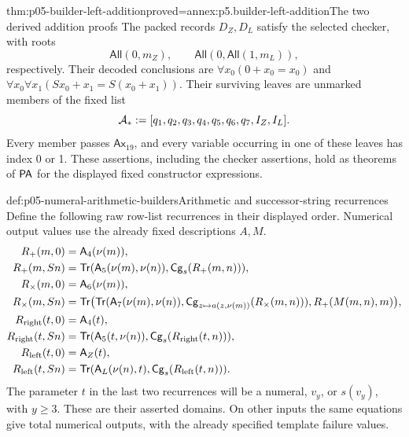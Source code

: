 \begin{hblemma}{thm:p05-builder-left-addition}{proved=annex:p5.builder-left-addition}{The two derived addition proofs}
The packed records \(D_Z,D_L\) satisfy the selected checker, with roots
\[
 \mathsf{All}(0,m_Z),\qquad
 \mathsf{All}(0,\mathsf{All}(1,m_L)),
\]
respectively. Their decoded conclusions are
\(\forall x_0(0+x_0=x_0)\) and
\(\forall x_0\forall x_1(Sx_0+x_1=S(x_0+x_1))\).
Their surviving leaves are unmarked members of the fixed list
\[
 \mathcal A_*\mathrel{:=}[q_1,q_2,q_3,q_4,q_5,q_6,q_7,I_Z,I_L].
\]
Every member passes \(\mathsf{Ax}_{19}\), and every variable occurring in
one of these leaves has index 0 or 1. These assertions, including the
checker assertions, hold as theorems of \(\mathsf{PA}\) for the displayed fixed
constructor expressions.
\end{hblemma}

\begin{hbdefinition}{def:p05-numeral-arithmetic-builders}{Arithmetic and successor-string recurrences}
Define the following raw row-list recurrences in their displayed order.
Numerical output values use the already fixed descriptions \(A,M\).
\[
\begin{aligned}
 R_+(m,0)&=\mathsf A_4(\nu(m)),\\
 R_+(m,Sn)&=\mathsf{Tr}(\mathsf A_5(\nu(m),\nu(n)),
                                      \mathsf{Cg}_s(R_+(m,n))),\\
 R_\times(m,0)&=\mathsf A_6(\nu(m)),\\
 R_\times(m,Sn)&=\mathsf{Tr}\bigl(
   \mathsf{Tr}(\mathsf A_7(\nu(m),\nu(n)),
                 \mathsf{Cg}_{z\mapsto a(z,\nu(m))}(R_\times(m,n))),
                                            R_+(M(m,n),m)\bigr),\\
 R_{\rm right}(t,0)&=\mathsf A_4(t),\\
 R_{\rm right}(t,Sn)&=\mathsf{Tr}(\mathsf A_5(t,\nu(n)),
                                \mathsf{Cg}_s(R_{\rm right}(t,n))),\\
 R_{\rm left}(t,0)&=\mathsf A_Z(t),\\
 R_{\rm left}(t,Sn)&=\mathsf{Tr}(\mathsf A_L(\nu(n),t),
                                 \mathsf{Cg}_s(R_{\rm left}(t,n))).
\end{aligned}
\]
The parameter \(t\) in the last two recurrences will be a numeral,
\(v_y\), or \(s(v_y)\), with \(y\geq3\). These are their asserted
domains. On other inputs the same equations give total numerical outputs,
with the already specified template failure values.
\end{hbdefinition}

